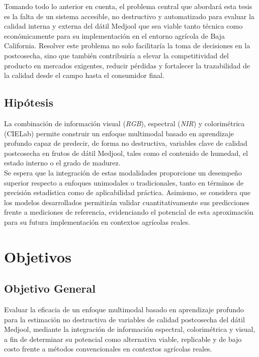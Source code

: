 Tomando todo lo anterior en cuenta, el problema central que abordará esta tesis es la falta de un sistema accesible, no destructivo y automatizado para evaluar la calidad interna y externa del dátil Medjool que sea viable tanto técnica como económicamente para su implementación en el entorno agrícola de Baja California. Resolver este problema no solo facilitaría la toma de decisiones en la postcosecha, sino que también contribuiría a elevar la competitividad del producto en mercados exigentes, reducir pérdidas y fortalecer la trazabilidad de la calidad desde el campo hasta el consumidor final.


\subsection{Hipótesis}

La combinación de información visual (\textit{RGB}), espectral (\textit{NIR}) y colorimétrica (CIELab) permite construir un enfoque multimodal basado en aprendizaje profundo capaz de predecir, de forma no destructiva, variables clave de calidad postcosecha en frutos de dátil Medjool, tales como el contenido de humedad, el estado interno o el grado de madurez.\\

Se espera que la integración de estas modalidades proporcione un desempeño superior respecto a enfoques unimodales o tradicionales, tanto en términos de precisión estadística como de aplicabilidad práctica. Asimismo, se considera que los modelos desarrollados permitirán validar cuantitativamente sus predicciones frente a mediciones de referencia, evidenciando el potencial de esta aproximación para su futura implementación en contextos agrícolas reales.


\section{Objetivos}

\subsection{Objetivo General}

Evaluar la eficacia de un enfoque multimodal basado en aprendizaje profundo para la estimación no destructiva de variables de calidad postcosecha del dátil Medjool, mediante la integración de información espectral, colorimétrica y visual, a fin de determinar su potencial como alternativa viable, replicable y de bajo costo frente a métodos convencionales en contextos agrícolas reales.


